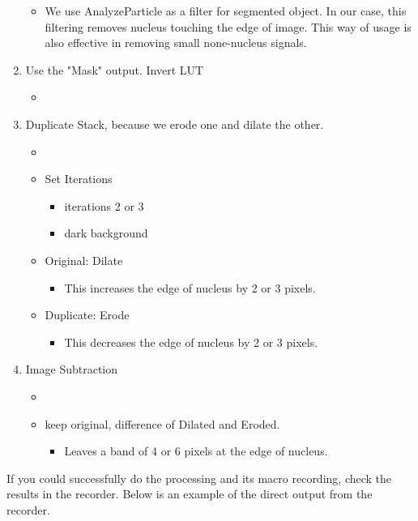 \begin{enumerate}
\begin{itemize}
\begin{itemize}
\end{itemize}
    \item We use AnalyzeParticle as a filter for segmented object. In our case, this filtering removes nucleus touching the edge of image. This way of usage is also effective in removing small none-nucleus signals. 
  
\end{itemize}
  \item Use the "Mask" output. Invert LUT

\begin{itemize}
    \item {}
  
\end{itemize}
  \item Duplicate Stack, because we erode one and dilate the other.

\begin{itemize}
    \item {}
    \item Set Iterations 

\begin{itemize}
      \item iterations 2 or 3
      \item dark background
    
\end{itemize}
    \item Original: Dilate 

\begin{itemize}
      \item This increases the edge of nucleus by 2 or 3 pixels. 
    
\end{itemize}
    \item Duplicate: Erode 

\begin{itemize}
      \item This decreases the edge of nucleus by 2 or 3 pixels. 
    
\end{itemize}
  
\end{itemize}
  \item Image Subtraction

\begin{itemize}
    \item {}
    \item keep original, difference of Dilated and Eroded.

\begin{itemize}
      \item Leaves a band of 4 or 6 pixels at the edge of nucleus. 
    
\end{itemize}
  
\end{itemize}

\end{enumerate}

If you could successfully do the processing and its macro recording, check the results in the recorder. Below is an example of the direct output from the recorder.